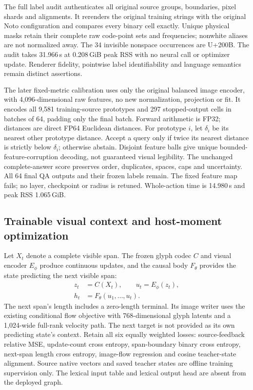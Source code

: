 \documentclass[12pt,a4paper]{article}
\providecommand{\DIFadd}[1]{{\protect\color{blue} \sf #1}} %
\begin{document}
\DIFadd{The full label audit authenticates all original source groups, boundaries,
pixel shards and alignments. It rerenders the original training strings with
the original Noto configuration and compares every binary cell exactly. Unique
physical masks retain their complete raw code-point sets and frequencies;
nonwhite aliases are not normalized away. The 34 invisible nonspace occurrences
are U+200B. The audit takes 31.966\,s at 0.208\,GiB peak RSS with no neural call
or optimizer update. Renderer fidelity, pointwise label identifiability and
language semantics remain distinct assertions.
}

\DIFadd{The later fixed-metric calibration uses only the original balanced image
encoder, with 4,096-dimensional raw features, no new normalization, projection
or fit. It encodes all 9,581 training-source prototypes and 297 stopped-output
cells in batches of 64, padding only the final batch. Forward arithmetic is
FP32; distances are direct FP64 Euclidean distances. For prototype $i$, let
$\delta_i$ be its nearest other prototype distance. Accept a query only if
twice its nearest distance is strictly below $\delta_i$; otherwise abstain.
Disjoint feature balls give unique bounded-feature-corruption decoding, not
guaranteed visual legibility. The unchanged complete-answer score preserves
order, duplicates, spaces, caps and uncertainty. All 64 final QA outputs and
their frozen labels remain. The fixed feature map fails; no layer, checkpoint
or radius is retuned. Whole-action time is 14.980\,s and peak RSS 1.065\,GiB.
}

\subsection*{\DIFadd{Trainable visual context and host-moment optimization}}

\DIFadd{Let $X_t$ denote a complete visible span. The frozen glyph codec $C$ and visual
encoder $E_\phi$ produce continuous updates, and the causal body $F_\theta$
provides the state predicting the next visible span:
}\begin{equation}
 \begin{aligned}
 z_t&=C(X_t),\qquad u_t=E_\phi(z_t),\\
 h_t&=F_\theta(u_1,\ldots,u_t).
 \end{aligned}
 \label{eq:trainable-visual-context}
\end{equation}
\DIFadd{The next span's length includes a zero-length terminal. Its image writer uses
the existing conditional flow objective with 768-dimensional glyph latents and
a 1,024-wide full-rank velocity path. The next target is not provided as its
own predicting state's context. Retain all six equally weighted losses:
source-feedback relative MSE, update-count cross entropy, span-boundary binary
cross entropy, next-span length cross entropy, image-flow regression and
cosine teacher-state alignment. Source native vectors and saved teacher states
are offline training supervision only. The lexical input table and lexical
output head are absent from the deployed graph.
}
\end{document}
